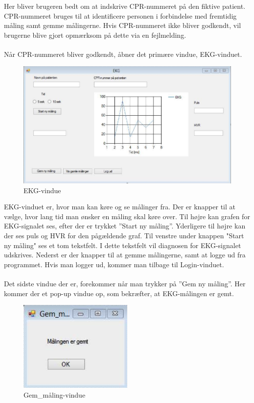 Her bliver brugeren bedt om at indskrive CPR-nummeret på den fiktive patient. CPR-nummeret bruges til at identificere personen i forbindelse med fremtidig måling samt gemme målingerne. Hvis CPR-nummeret ikke bliver godkendt, vil brugerne blive gjort opmærksom på dette via en fejlmelding. 
\\
\\
Når CPR-nummeret bliver godkendt, åbner det primære vindue, EKG-vinduet. 

\begin{figure}[H]
	\centering
	\includegraphics[width=1\textwidth]{Figurer/Snip20150430_40}
	\caption{EKG-vindue}
\end{figure}

EKG-vinduet er, hvor man kan køre og se målinger fra. Der er knapper til at vælge, hvor lang tid man ønsker en måling skal køre over. Til højre kan grafen for EKG-signalet ses, efter der er trykket ”Start ny måling”. Yderligere til højre kan der ses puls og HVR for den pågældende graf. Til venstre under knappen "Start ny måling" ses et tom tekstfelt. I dette tekstfelt vil diagnosen for EKG-signalet udskrives. Nederst er der knapper til at gemme målingerne, samt at logge ud fra programmet. Hvis man logger ud, kommer man tilbage til Login-vinduet. 
\\
\\
Det sidste vindue der er, forekommer når man trykker på ”Gem ny måling”. Her kommer der et pop-up vindue op, som bekræfter, at EKG-målingen er gemt. 

\begin{figure}[H]
	\centering
	\includegraphics[width=0.5\textwidth]{Figurer/Snip20150430_41}
	\caption{Gem\_måling-vindue}
\end{figure}

